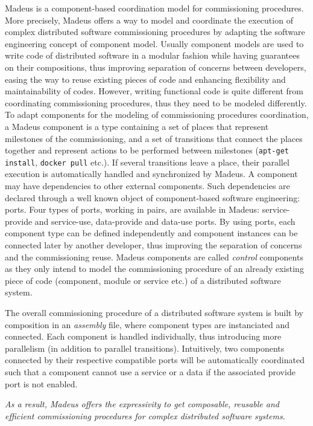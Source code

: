 Madeus is a component-based coordination model for commissioning
procedures. More precisely, Madeus offers a way to model and
coordinate the execution of complex distributed software commissioning
procedures by adapting the software engineering concept of component
model. Usually component models are used to write code of distributed
software in a modular fashion while having guarantees on their
compositions, thus improving separation of concerns between
developers, easing the way to reuse existing pieces of code and
enhancing flexibility and maintainability of codes. However, writing
functional code is quite different from coordinating commissioning
procedures, thus they need to be modeled differently. To adapt
components for the modeling of commissioning procedures coordination,
a Madeus component is a type containing a set of places that represent
milestones of the commissioning, and a set of transitions that connect
the places together and represent actions to be performed between
milestones (\eg \texttt{apt-get install}, \texttt{docker pull}
etc.). If several transitions leave a place, their parallel execution
is automatically handled and synchronized by Madeus. A component may
have dependencies to other external components. Such dependencies are
declared through a well known object of component-based software
engineering: ports. Four types of ports, working in pairs, are
available in Madeus: service-provide and service-use, data-provide and
data-use ports. By using ports, each component type can be defined
independently and component instances can be connected later by
another developer, thus improving the separation of concerns and the
commissioning reuse. Madeus components are called \emph{control}
components as they only intend to model the commissioning procedure of
an already existing piece of code (component, module or service etc.)
of a distributed software system.

The overall commissioning procedure of a distributed software system
is built by composition in an \emph{assembly} file, where component
types are instanciated and connected. Each component is handled
individually, thus introducing more parallelism (in addition to
parallel transitions). Intuitively, two components connected by their
respective compatible ports will be automatically coordinated such
that a component cannot use a service or a data if the associated
provide port is not enabled.

\emph{As a result, Madeus offers the expressivity to get composable,
reusable and efficient commissioning procedures for complex
distributed software systems.}

